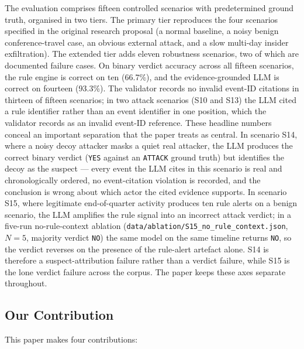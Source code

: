 \documentclass[conference]{IEEEtran}
\begin{document}
The evaluation comprises fifteen controlled scenarios with predetermined ground truth, organised in two tiers. The primary tier reproduces the four scenarios specified in the original research proposal (a normal baseline, a noisy benign conference-travel case, an obvious external attack, and a slow multi-day insider exfiltration). The extended tier adds eleven robustness scenarios, two of which are documented failure cases. On binary verdict accuracy across all fifteen scenarios, the rule engine is correct on ten (66.7\%), and the evidence-grounded LLM is correct on fourteen (93.3\%). The validator records no invalid event-ID citations in thirteen of fifteen scenarios; in two attack scenarios (S10 and S13) the LLM cited a rule identifier rather than an event identifier in one position, which the validator records as an invalid event-ID reference. These headline numbers conceal an important separation that the paper treats as central. In scenario S14, where a noisy decoy attacker masks a quiet real attacker, the LLM produces the correct binary verdict (\texttt{YES} against an \texttt{ATTACK} ground truth) but identifies the decoy as the suspect --- every event the LLM cites in this scenario is real and chronologically ordered, no event-citation violation is recorded, and the conclusion is wrong about which actor the cited evidence supports. In scenario S15, where legitimate end-of-quarter activity produces ten rule alerts on a benign scenario, the LLM amplifies the rule signal into an incorrect attack verdict; in a five-run no-rule-context ablation (\texttt{data/ablation/S15\_no\_rule\_context.json}, $N=5$, majority verdict \texttt{NO}) the same model on the same timeline returns \texttt{NO}, so the verdict reverses on the presence of the rule-alert artefact alone. S14 is therefore a suspect-attribution failure rather than a verdict failure, while S15 is the lone verdict failure across the corpus. The paper keeps these axes separate throughout.

\subsection{Our Contribution}
\label{sec:contribution}

This paper makes four contributions:
\end{document}
